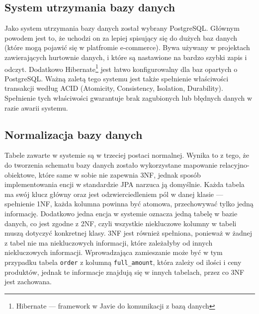 \subsection{System utrzymania bazy danych}
Jako system utrzymania bazy danych został wybrany PostgreSQL. Głównym powodem jest to, że uchodzi on za lepiej spisujący się do dużych baz danych (które mogą pojawić się w platfromie e-commerce). Bywa używany w projektach zawierających hurtownie danych, i które są nastawione na bardzo szybki zapis i odczyt.  Dodatkowo Hibernate\footnote{Hibernate — framework w Javie do komunikacji z bazą danych} jest łatwo konfigurowalny dla baz opartych o PostgreSQL. Ważną zaletą tego systemu jest także spełnienie właściwości transakcji według ACID (Atomicity, Consistency, Isolation, Durability). Spełnienie tych właściwości gwarantuje brak zagubionych lub błędnych danych w razie awarii systemu. 

\subsection{Normalizacja bazy danych}
Tabele zawarte w systemie są w trzeciej postaci normalnej. Wynika to z tego, że do tworzenia schematu bazy danych zostało wykorzystane mapowanie relacyjno-obiektowe, które same w sobie nie zapewnia 3NF, jednak sposób implementowania encji w standardzie JPA narzuca ją domyślnie. Każda tabela ma swój klucz główny oraz jest odzwierciedleniem pól w danej klasie — spełnienie 1NF, każda kolumna powinna być atomowa, przechowywać tylko jedną informację. Dodatkowo jedna encja w systemie oznacza jedną tabelę w bazie danych, co jest zgodne z 2NF, czyli wszystkie niekluczowe kolumny w tabeli muszą dotyczyć konkretnej klasy. 3NF jest również spełniona, ponieważ w żadnej z tabel nie ma niekluczowych informacji, które zależałyby od innych niekluczowych informacji. Wprowadzająca zamieszanie może być w tym przypadku tabela \texttt{order} z kolumną \texttt{full\_amount}, która zależy od ilości i ceny produktów, jednak te informacje znajdują się w innych tabelach, przez co 3NF jest zachowana. 
